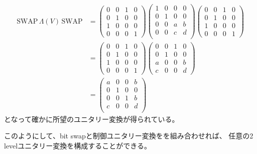 \documentclass[]{ltjsarticle}
\begin{document}
\begin{align}
    \text{SWAP}\,\Lambda(V)\,\text{SWAP}
    &=
    \begin{pmatrix}
        0 & 0 & 1 & 0 \\
        0 & 1 & 0 & 0 \\
        1 & 0 & 0 & 0 \\
        0 & 0 & 0 & 1
    \end{pmatrix}
    \begin{pmatrix}
        1 & 0 & 0 & 0 \\ 
        0 & 1 & 0 & 0 \\ 
        0 & 0 & a & b \\ 
        0 & 0 & c & d \\ 
    \end{pmatrix}
    \begin{pmatrix}
        0 & 0 & 1 & 0 \\
        0 & 1 & 0 & 0 \\
        1 & 0 & 0 & 0 \\
        0 & 0 & 0 & 1
    \end{pmatrix}    \\
    &=
    \begin{pmatrix}
        0 & 0 & 1 & 0 \\
        0 & 1 & 0 & 0 \\
        1 & 0 & 0 & 0 \\
        0 & 0 & 0 & 1
    \end{pmatrix}    
    \begin{pmatrix}
        0 & 0 & 1 & 0 \\
        0 & 1 & 0 & 0 \\
        a & 0 & 0 & b \\
        c & 0 & 0 & d
    \end{pmatrix}    \\
    &=
    \begin{pmatrix}
        a & 0 & 0 & b \\ 
        0 & 1 & 0 & 0 \\ 
        0 & 0 & 1 & b \\ 
        c & 0 & 0 & d \\ 
    \end{pmatrix}
\end{align}
となって確かに所望のユニタリー変換が得られている。

このようにして、bit swapと制御ユニタリー変換をを組み合わせれば、
任意の2 levelユニタリー変換を構成することができる。
\end{document}
